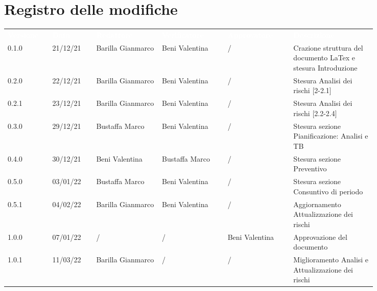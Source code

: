 \section*{Registro delle modifiche}

{\renewcommand{\arraystretch}{1.5}
\scriptsize
\begin{tabular}{p{0.10\linewidth}p{0.10\linewidth}p{0.15\linewidth}p{0.15\linewidth}p{0.15\linewidth}p{0.19\linewidth}}
	\rowcolor[RGB]{33, 73, 50}
	\textcolor{white}{\textbf{Versione}} & \textcolor{white}{\textbf{Data}} &
	\textcolor{white}{\textbf{Redattore}} & \textcolor{white}{\textbf{Verificatore}} &
	\textcolor{white}{\textbf{Approvatore}} & \textcolor{white}{\textbf{Descrizione}}\\
	\rowcolor[RGB]{216, 235, 171}
	0.1.0 & 21/12/21 & Barilla Gianmarco & Beni Valentina & / & Crazione struttura del documento LaTex e stesura Introduzione\\
	\rowcolor[RGB]{233, 245, 206}
	0.2.0 & 22/12/21 & Barilla Gianmarco & Beni Valentina & / & Stesura Analisi dei rischi [2-2.1]\\
	\rowcolor[RGB]{216, 235, 171}
	0.2.1 & 23/12/21 & Barilla Gianmarco& Beni Valentina & / & Stesura Analisi dei rischi [2.2-2.4]\\
	\rowcolor[RGB]{233, 245, 206}
	0.3.0 & 29/12/21 & Bustaffa Marco& Beni Valentina & / & Stesura sezione Pianificazione: Analisi e TB\\
	\rowcolor[RGB]{216, 235, 171}
	0.4.0 & 30/12/21 & Beni Valentina& Bustaffa Marco & / & Stesura sezione Preventivo\\
	\rowcolor[RGB]{233, 245, 206}
	0.5.0 & 03/01/22 & Bustaffa Marco& Beni Valentina & / & Stesura sezione Consuntivo di periodo\\
	\rowcolor[RGB]{216, 235, 171}
	0.5.1 & 04/02/22 & Barilla Gianmarco& Beni Valentina & / & Aggiornamento Attualizzazione dei rischi\\
	\rowcolor[RGB]{233, 245, 206}
	1.0.0 & 07/01/22 & / & / & Beni Valentina & Approvazione del documento\\
	\rowcolor[RGB]{216, 235, 171}
	1.0.1 & 11/03/22 & Barilla Gianmarco& / & / & Miglioramento Analisi e Attualizzazione dei rischi\\
\end{tabular}	
}